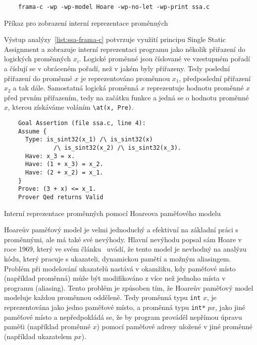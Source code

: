 \begin{listing}[H]
    \begin{verbatim}
    frama-c -wp -wp-model Hoare -wp-no-let -wp-print ssa.c
    \end{verbatim}
    \caption{Příkaz pro zobrazení interní reprezentace proměnných}
    \label{list:ssa-example-run}
\end{listing}

Výstup analýzy~\ref{list:ssa-frama-c} potvrzuje využití principu Single Static Assignment
a zobrazuje interní reprezentaci programu jako několik přiřazení do logických proměnných $x_i$.
Logické proměnné jsou číslované ve vzestupném pořadí a číslují se v obráceném pořadí, než v jakém byly přiřazeny.
Tedy poslední přiřazení do proměnné $x$ je reprezentováno proměnnou $x_1$, předposlední přiřazení $x_2$ a tak dále.
Samostatná logická proměnná $x$ reprezentuje hodnotu proměnné $x$ před prvním přiřazením,
tedy na začátku funkce a jedná se o hodnotu proměnné $x$, kterou získáváme voláním \texttt{\textbackslash at(x, Pre)}.

\begin{listing}[H]
    \begin{verbatim}
    Goal Assertion (file ssa.c, line 4):
    Assume {
      Type: is_sint32(x_1) /\ is_sint32(x)
              /\ is_sint32(x_2) /\ is_sint32(x_3).
      Have: x_3 = x.
      Have: (1 + x_3) = x_2.
      Have: (2 + x_2) = x_1.
    }
    Prove: (3 + x) <= x_1.
    Prover Qed returns Valid
    \end{verbatim}
    \caption{Interní reprezentace proměnných pomocí Hoareova paměťového modelu}
    \label{list:ssa-frama-c}
\end{listing}


Hoareův paměťový model je velmi jednoduchý a efektivní na základní práci s proměnnými, ale má také své nevýhody.
Hlavní nevýhodu popsal sám Hoare v roce 1969, který ve svém článku~\cite{Hoare1969} uvádí,
že tento model je nevhodný na analýzu kódu, který pracuje s ukazateli, dynamickou pamětí a možným aliasingem.
Problém při modelování ukazatelů nastává v okamžiku,
kdy paměťové místo (například proměnná) může být modifikováno z více než jednoho místa v programu (aliasing).
Tento problém je způsoben tím, že Hoareův paměťový model modeluje každou proměnnou odděleně.
Tedy proměnná typu \texttt{int} $x$, je reprezentována jako jedno paměťové místo,
a proměnná typu \texttt{int*} $px$, jako jiné paměťové místo a nepředpokládá se,
že by program prováděl nepřímou úpravu paměťi (například proměnné $x$) pomocí paměťové adresy
uložené v jiné proměnné (například ukazatelem $px$).

